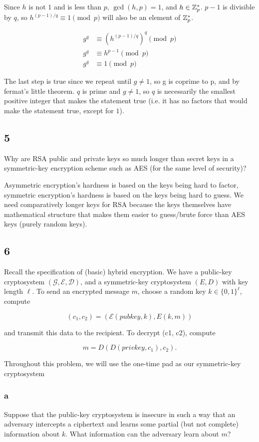 \documentclass[11pt]{article}
\begin{document}
Since $h$ is not $1$ and is less than $p$, $\gcd(h, p) = 1$, and $h \in \mathbb{Z}^*_p$. $p - 1$ is divisible by $q$, so $h^{(p-1)/q} \equiv 1 \pmod{p}$ will also be an element of $\mathbb{Z}^*_p$.

\begin{align*}
  g^q &\equiv (h^{(p-1)/q})^q \pmod{p} \\
  g^q &\equiv h^{p-1} \pmod{p} \\
  g^q &\equiv 1 \pmod{p}
\end{align*}

The last step is true since we repeat until $g \neq 1$, so g is coprime to p, and by fermat's little theorem. $q$ is prime and $g \neq 1$, so $q$ is necessarily the smallest positive integer that makes the statement true (i.e. it has no factors that would make the statement true, except for $1$).

\subsection{5} Why are RSA public and private keys so much longer than secret keys in a symmetric-key encryption scheme such as AES (for the same level of security)?

Asymmetric encryption's hardness is based on the keys being hard to factor, symmetric encryption's hardness is based on the keys being hard to guess. We need comparatively longer keys for RSA because the keys themselves have mathematical structure that makes them easier to guess/brute force than AES keys (purely random keys).

\subsection{6} Recall the speciﬁcation of (basic) hybrid encryption. We have a public-key cryptosystem $(\mathcal{G}, \mathcal{E}, \mathcal{D})$, and a symmetric-key cryptosystem $(E, D)$ with key length $\ell$. To send an encrypted message $m$, choose a random key $k \in \{0, 1\}^\ell$, compute

$$(c_1, c_2) = (\mathcal{E}(pubkey, k), E(k, m))$$

and transmit this data to the recipient. To decrypt (c1, c2), compute

$$m = D(D(privkey, c_1), c_2).$$

Throughout this problem, we will use the one-time pad as our symmetric-key cryptosystem

\subsubsection{a} Suppose that the public-key cryptosystem is insecure in such a way that an adversary intercepts a ciphertext and learns some partial (but not complete) information about $k$. What information can the adversary learn about $m$?
\end{document}
